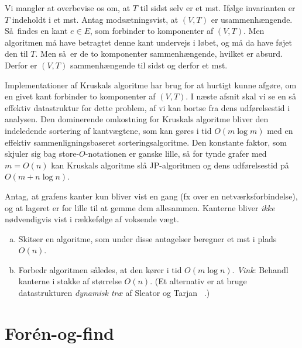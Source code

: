 Vi mangler at overbevise os om, at $T$ til sidst selv er et mst.
Ifølge invarianten er $T$ indeholdt i et mst.
Antag modsætningsvist, at $(V,T)$ er usammenhængende.
Så findes en kant $e\in E$, som forbinder to komponenter af $(V,T)$. 
Men algoritmen må have betragtet denne kant undervejs i løbet, og må da have føjet den til $T$.
Men så er de to komponenter sammenhængende, hvilket er absurd.
Derfor er $(V,T)$ sammenhængende til sidst og derfor et mst.

Implementationer af Kruskals algoritme har brug for at hurtigt kunne afgøre, om en givet kant forbinder to komponenter af $(V,T)$.
I næste afsnit skal vi se en så effektiv datastruktur for dette problem, af vi kan bortse fra dens udførelsestid i analysen.
Den dominerende omkostning for Kruskals algoritme bliver den indeledende sortering af kantvægtene, som kan gøres i tid $O(m\log m)$ med en effektiv sammenligningsbaseret sorteringsalgoritme.
Den konstante faktor, som skjuler sig bag store-$O$-notationen er ganske lille, så for tynde grafer med $m=O(n)$ kan Kruskals algoritme slå JP-algoritmen og dens udførelsestid på $O(m+n\log n)$. 


\begin{exerc}
  Antag, at grafens kanter kun bliver vist en gang (fx over en netværksforbindelse), og at lageret er for lille til at gemme dem allesammen. 
  Kanterne bliver \emph{ikke} nødvendigvis vist i rækkefølge af voksende vægt.
  \begin{enumerate}[(a)]
    \item Skitser en algoritme, som under disse antagelser beregner et mst i plads $O(n)$.
\item
  Forbedr algoritmen således, at den kører i tid $O(m\log n)$.
  \emph{Vink}: Behandl kanterne i stakke af størrelse $O(n)$.
      (Et alternativ er at bruge datastrukturen \emph{dynamisk træ} af Sleator og Tarjan ~\cite{SleTar83}.)
\end{enumerate}
\end{exerc}

\section{Forén-og-find}
%

